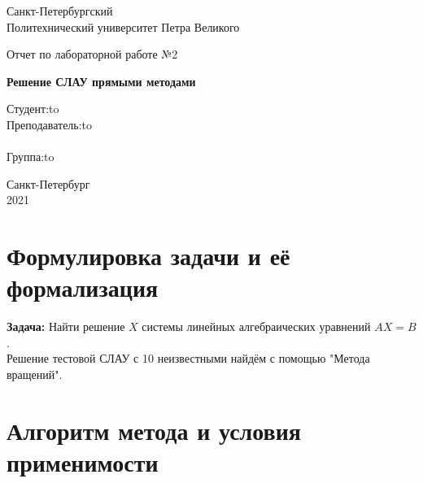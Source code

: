\documentclass[12pt]{article}
\begin{document}
\begin{titlepage}
\Large

\begin{center}
Санкт-Петербургский \\ Политехнический университет Петра Великого

\vspace{10em}

Отчет по лабораторной работе №2\\

\vspace{2em}

\textbf{Решение СЛАУ прямыми методами}
\end{center}

\vspace{6em}

\newbox{\lbox}
\newlength{\maxl}
\setlength{\maxl}{\wd\lbox}
\hfill\parbox{14cm}{
\hspace*{5cm}\hspace*{-5cm}Студент:\hfill\hbox to\\
\hspace*{5cm}\hspace*{-5cm}Преподаватель:\hfill\hbox to\\
\\
\hspace*{5cm}\hspace*{-5cm}Группа:\hfill\hbox to\\}

\vspace{\fill}
\begin{center}
Санкт-Петербург \\2021
\end{center}
\end{titlepage}

\section{Формулировка задачи и её формализация}
\textbf{Задача:}
Найти решение $X$ системы линейных алгебраических уравнений $AX = B$.\\
Решение тестовой СЛАУ с 10 неизвестными найдём с помощью "Метода вращений". 

\section{Алгоритм метода и условия применимости}
\end{document}
